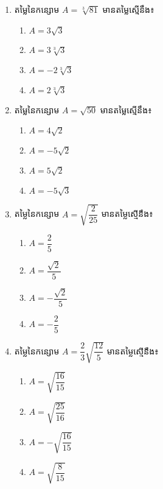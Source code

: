 \begin{enumerate}
\item តម្លៃនៃកន្សោម $A=\sqrt[3]{81}$ មានតម្លៃស្មើនឹង៖
\begin{multicols}{4}
\begin{enumerate}[label=\alph*.]
	\item $A=3\sqrt{3}$
	\item $A=3\sqrt[3]{3}$
	\item $A=-2\sqrt[3]{3}$
	\item $A=2\sqrt[3]{3}$
\end{enumerate}
\end{multicols}

\item តម្លៃនៃកន្សោម $A=\sqrt{50}$ មានតម្លៃស្មើនឹង៖
\begin{multicols}{4}
\begin{enumerate}[label=\alph*.]
	\item $A=4\sqrt{2}$
	\item $A=-5\sqrt{2}$
	\item $A=5\sqrt{2}$
	\item $A=-5\sqrt{3}$
\end{enumerate}
\end{multicols}

\item តម្លៃនៃកន្សោម $A=\sqrt{\dfrac{2}{25}}$ មានតម្លៃស្មើនឹង៖
\begin{multicols}{4}
\begin{enumerate}[label=\alph*.]
	\item $A=\dfrac{2}{5}$
	\item $A=\dfrac{\sqrt{2}}{5}$
	\item $A=-\dfrac{\sqrt{2}}{5}$
	\item $A=-\dfrac{2}{5}$
\end{enumerate}
\end{multicols}

\item តម្លៃនៃកន្សោម $A=\dfrac{2}{3}\sqrt{\dfrac{12}{5}}$ មានតម្លៃស្មើនឹង៖
\begin{multicols}{4}
\begin{enumerate}[label=\alph*.]
	\item $A=\sqrt{\dfrac{16}{15}}$
	\item $A=\sqrt{\dfrac{25}{16}}$
	\item $A=-\sqrt{\dfrac{16}{15}}$
	\item $A=\sqrt{\dfrac{8}{15}}$
\end{enumerate}
\end{multicols}


\end{enumerate}
